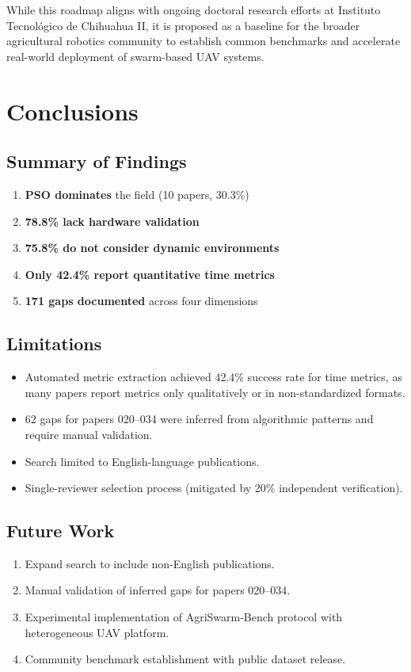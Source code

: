 \documentclass[review,3p,times]{elsarticle}
\begin{document}
While this roadmap aligns with ongoing doctoral research efforts at Instituto Tecnológico de Chihuahua II, it is proposed as a baseline for the broader agricultural robotics community to establish common benchmarks and accelerate real-world deployment of swarm-based UAV systems.

\section{Conclusions}

\subsection{Summary of Findings}
\begin{enumerate}
  \item \textbf{PSO dominates} the field (10 papers, 30.3\%)
  \item \textbf{78.8\% lack hardware validation}
  \item \textbf{75.8\% do not consider dynamic environments}
  \item \textbf{Only 42.4\% report quantitative time metrics}
  \item \textbf{171 gaps documented} across four dimensions
\end{enumerate}

\subsection{Limitations}
\label{sec:limitations}
\begin{itemize}
  \item Automated metric extraction achieved 42.4\% success rate for time metrics, as many papers report metrics only qualitatively or in non-standardized formats.
  \item 62 gaps for papers 020--034 were inferred from algorithmic patterns and require manual validation.
  \item Search limited to English-language publications.
  \item Single-reviewer selection process (mitigated by 20\% independent verification).
\end{itemize}

\subsection{Future Work}
\begin{enumerate}
  \item Expand search to include non-English publications.
  \item Manual validation of inferred gaps for papers 020--034.
  \item Experimental implementation of AgriSwarm-Bench protocol with heterogeneous UAV platform.
  \item Community benchmark establishment with public dataset release.
\end{enumerate}
\end{document}
